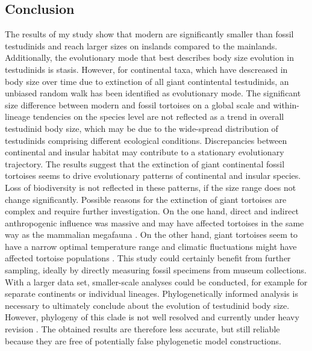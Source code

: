 \subsection{Conclusion}
The results of my study show that modern \T are significantly smaller than fossil testudinids and reach larger sizes on inslands compared to the mainlands.
Additionally, the evolutionary mode that best describes body size evolution in testudinids is stasis.
However, for continental taxa, which have descreased in body size over time due to extinction of all giant contintental testudinids, an unbiased random walk has been identified as evolutionary mode.
The significant size difference between modern and fossil tortoises on a global scale and within-lineage tendencies on the species level are not reflected as a trend in overall testudinid body size, which may be due to the wide-spread distribution of testudinids comprising different ecological conditions.
Discrepancies between continental and insular habitat may contribute to a stationary evolutionary trajectory.
The results suggest that the extinction of giant continental fossil tortoises seems to drive evolutionary patterns of continental and insular species. Loss of biodiversity is not reflected in these patterns, if the size range does not change significantly.
Possible reasons for the extinction of giant tortoises are complex and require further investigation. On the one hand, direct and indirect anthropogenic influence was massive and may have affected tortoises in the same way as the mammalian megafauna \citep{Barnosky2004,Sandom2014}. On the other hand, giant tortoises seem to have a narrow optimal temperature range and climatic fluctuations might have affected tortoise populations \citep{Cione2003}.
This study could certainly benefit from further sampling, ideally by directly measuring fossil specimens from museum collections.
With a larger data set, smaller-scale analyses could be conducted, for example for separate continents or individual lineages.
Phylogenetically informed analysis is necessary to ultimately conclude about the evolution of testudinid body size. However, phylogeny of this clade is not well resolved and currently under heavy revision \citep{LapparentdeBroin2006}. The obtained results are therefore less accurate, but still reliable because they are free of potentially false phylogenetic model constructions.

